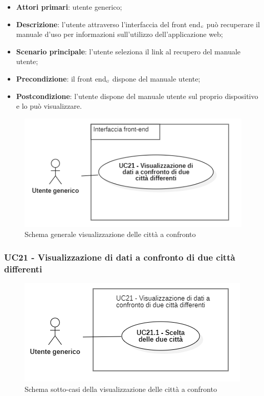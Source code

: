\begin{itemize}
	\item \textbf{Attori primari}: utente generico;
	\item \textbf{Descrizione}: l'utente attraverso l'interfaccia del front end$_{\scaleto{G}{3pt}}$ può recuperare il manuale d'uso per informazioni sull'utilizzo dell'applicazione web;
	\item \textbf{Scenario principale}: l'utente seleziona il link al recupero del manuale utente;
	\item \textbf{Precondizione}: il front end$_{\scaleto{G}{3pt}}$ dispone del manuale utente;
	\item \textbf{Postcondizione}: l'utente dispone del manuale utente sul proprio dispositivo e lo può visualizzare.
\end{itemize}


\begin{center}
	\begin{figure}[H]
		\centering\includegraphics[scale=0.7]{../immagini/attori_casi/UC_21.png}
		\caption{Schema generale visualizzazione delle città a confronto}
	\end{figure}
\end{center}


\subsubsection{UC21 - Visualizzazione di dati a confronto di due città differenti}\label{CasiDUsoCasiDUsoFacoltativiTraUnUtenteEIlFrontEndElencoCasiDUsoUC13VisualizzazioneDiDatiAConfrontoDiDueCittaDifferenti}
\begin{center}
	\begin{figure}[H]
		\centering\includegraphics[scale=0.7]{../immagini/attori_casi/UC_21_1.png}
		\caption{Schema sotto-casi della visualizzazione delle città a confronto}
	\end{figure}
\end{center}

